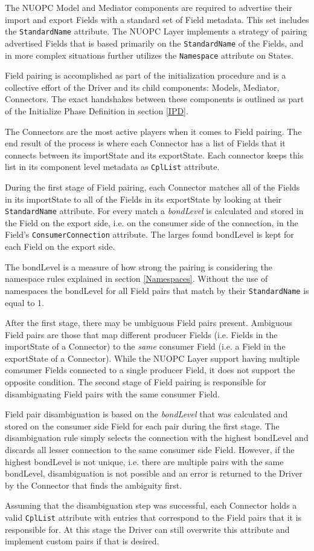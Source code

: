 %

\label{FieldPairing}

The NUOPC Model and Mediator components are required to advertise their import and export Fields with a standard set of Field metadata. This set includes the {\tt StandardName} attribute. The NUOPC Layer implements a strategy of pairing advertised Fields that is based primarily on the {\tt StandardName} of the Fields, and in more complex situations further utilizes the {\tt Namespace} attribute on States.

Field pairing is accomplished as part of the initialization procedure and is a collective effort of the Driver and its child components: Models, Mediator, Connectors. The exact handshakes between these components is outlined as part of the Initialize Phase Definition in section \ref{IPD}.

The Connectors are the most active players when it comes to Field pairing. The end result of the process is where each Connector has a list of Fields that it connects between its importState and its exportState. Each connector keeps this list in its component level metadata as {\tt CplList} attribute.

During the first stage of Field pairing, each Connector matches all of the Fields in its importState to all of the Fields in its exportState by looking at their {\tt StandardName} attribute. For every match a {\em bondLevel} is calculated and stored in the Field on the export side, i.e. on the consumer side of the connection, in the Field's {\tt ConsumerConnection} attribute. The larges found bondLevel is kept for each Field on the export side.

The bondLevel is a measure of how strong the pairing is considering the namespace rules explained in section \ref{Namespaces}. Without the use of namespaces the bondLevel for all Field pairs that match by their {\tt StandardName} is equal to 1.

After the first stage, there may be umbiguous Field pairs present. Ambiguous Field pairs are those that map different producer Fields (i.e. Fields in the importState of a Connector) to the {\em same} consumer Field (i.e. a Field in the exportState of a Connector). While the NUOPC Layer support having multiple comsumer Fields connected to a single producer Field, it does not support the opposite condition. The second stage of Field pairing is responsible for disambiguating Field pairs with the same consumer Field.

Field pair disambiguation is based on the {\em bondLevel} that was calculated and stored on the consumer side Field for each pair during the first stage. The disambiguation rule simply selects the connection with the highest bondLevel and discards all lesser connection to the same consumer side Field. However, if the highest bondLevel is not unique, i.e. there are multiple pairs with the same bondLevel, disambiguation is not possible and an error is returned to the Driver by the Connector that finds the ambiguity first.

Assuming that the disambiguation step was successful, each Connector holds a valid {\tt CplList} attribute with entries that correspond to the Field pairs that it is responsible for. At this stage the Driver can still overwrite this attribute and implement custom pairs if that is desired.

